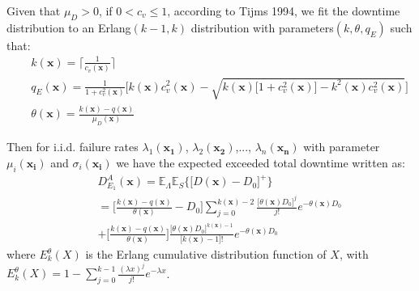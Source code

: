 \documentclass[preprint,12pt]{elsarticle}
\begin{document}
Given that $\mu_{D}>0$, if $0<c_{v}\leq 1$, according to Tijms 1994, we fit the downtime distribution to an Erlang$(k-1,k)$ distribution with parameters$(k,\theta,q_{E})$ such that:
\begin{eqnarray}
&&k(\boldsymbol{x}) = \lceil \frac{1}{c_{v}(\boldsymbol{x})} \rceil \label{k1}\\
&&q_{E}(\boldsymbol{x})= \frac{1}{1+c^{2}_{v}(\boldsymbol{x})}\bigg[k(\boldsymbol{x})c^{2}_{v}(\boldsymbol{x})-\sqrt{k(\boldsymbol{x})\big[1+c^{2}_{v}(\boldsymbol{x})\big]-k^{2}(\boldsymbol{x})c^{2}_{v}(\boldsymbol{x})} \bigg] \label{q1}\\
&&\theta(\boldsymbol{x}) = \frac{k(\boldsymbol{x})-q(\boldsymbol{x})}{\mu_{D}(\boldsymbol{x})} \label{theta1}
\end{eqnarray}

 Then for i.i.d. failure rates $\lambda_{1}(\boldsymbol{x_{1}})$, $\lambda_{2}(\boldsymbol{x_{2}})$,..., $\lambda_{n}(\boldsymbol{x_{n}})$ with parameter $\mu_{i}(\boldsymbol{x_{i}})$ and $\sigma_{i}(\boldsymbol{x_{i}})$ we have the expected exceeded total downtime written as:
\begin{eqnarray}
&&D_{E_{1}}^{A}(\boldsymbol{x})=\mathbb{E}_{\Lambda}\mathbb{E}_{S}\bigg\{\big[D(\boldsymbol{x})-D_{0}\big]^{+}\bigg\} \nonumber\\
&&=\bigg[\frac{k(\boldsymbol{x})-q(\boldsymbol{x})}{\theta(\boldsymbol{x})}-D_{0}\bigg]\sum_{j=0}^{k(\boldsymbol{x})-2}{\frac{\big[\theta(\boldsymbol{x}) D_{0}\big]^j}{j!}e^{-\theta(\boldsymbol{x})D_{0}}}\nonumber\\
&&+\bigg[\frac{k(\boldsymbol{x})-q(\boldsymbol{x})}{\theta(\boldsymbol{x})}\bigg]\frac{\big[\theta(\boldsymbol{x})D_{0}\big]^{k(\boldsymbol{x})-1}}{\big[k(\boldsymbol{x})-1\big]!}e^{-\theta(\boldsymbol{x})D_{0}}
\label{EXD1}
\end{eqnarray}
where $E_{k}^{\theta}(X)$ is the Erlang cumulative distribution function of $X$, with $E_{k}^{\theta}(X) = 1-\sum_{j=0}^{k-1}{\frac{(\lambda x)^{j}}{j!}e^{-\lambda x}}$.
\end{document}
